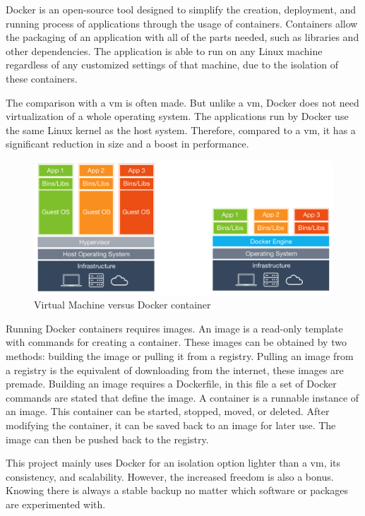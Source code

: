 Docker is an open\hyp{}source tool designed to simplify the creation, deployment, and running process of applications through the usage of containers. Containers allow the packaging of an application with all of the parts needed, such as libraries and other dependencies. The application is able to run on any Linux machine regardless of any customized settings of that machine, due to the isolation of these containers. \cite{opensource_what_is_docker}

The comparison with a \ac{vm} is often made. But unlike a \acs{vm}, Docker does not need virtualization of a whole operating system. The applications run by Docker use the same Linux kernel as the host system. Therefore, compared to a \acs{vm}, it has a significant reduction in size and a boost in performance. \cite{opensource_what_is_docker}

\begin{figure}[!h]
    \centering
    \includegraphics[width=0.8\linewidth]{images/vm_vs_container.png}
    \caption{Virtual Machine versus Docker container}
    \label{fig:vm_vs_container}
\end{figure}

Running Docker containers requires images. An image is a read\hyp{}only template with commands for creating a container. These images can be obtained by two methods: building the image or pulling it from a registry. Pulling an image from a registry is the equivalent of downloading from the internet, these images are premade. Building an image requires a Dockerfile, in this file a set of Docker commands are stated that define the image. A container is a runnable instance of an image. This container can be started, stopped, moved, or deleted. After modifying the container, it can be saved back to an image for later use. The image can then be pushed back to the registry. \cite{docker_get_started_overview}

This project mainly uses Docker for an isolation option lighter than a \acs{vm}, its consistency, and scalability. However, the increased freedom is also a bonus. Knowing there is always a stable backup no matter which software or packages are experimented with.
